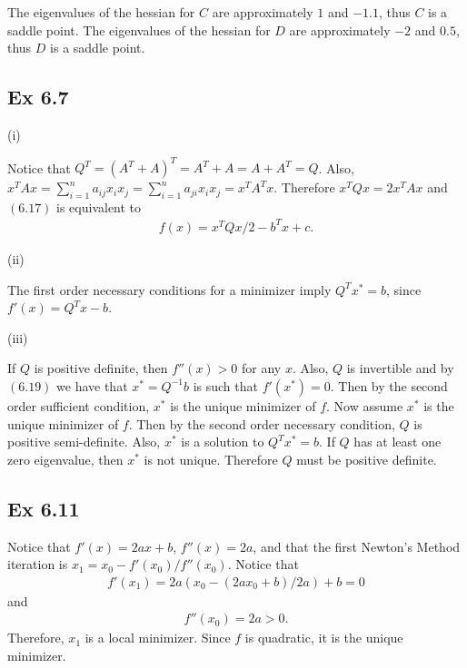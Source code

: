\documentclass[letterpaper,12pt]{article}
\theoremstyle{definition}
\begin{document}
\begin{spacing}{1.3}{}
	The eigenvalues of the hessian for $C$ are approximately $1$ and $-1.1$, thus $C$ is a saddle point. The eigenvalues of the hessian for $D$ are approximately $-2$ and $0.5$, thus $D$ is a saddle point.\\
	
	\subsection*{Ex 6.7}
	(i)
	
	Notice that $Q^T = (A^T + A)^T = A^T+ A = A + A^T = Q$.
	Also, $x^TAx = \sum_{i=1}^na_{ij}x_ix_j = \sum_{i=1}^na_{ji}x_ix_j = x^TA^Tx$.
	Therefore $x^TQx = 2x^TAx$ and $(6.17)$ is equivalent to
	\begin{align*}
	f(x) = x^TQx/2 - b^Tx +c.
	\end{align*}
	
	(ii)
	
	The first order necessary conditions for a minimizer imply
	$Q^Tx^* = b$, since $f'(x) = Q^Tx-b$.
	
	(iii)
	
	If $Q$ is positive definite, then $f''(x)>0$ for any $x$.
	Also, $Q$ is invertible and by $(6.19)$ we have 
	that $x^*=Q^{-1}b$ is such that $f'(x^*)=0$.
	Then by the second order sufficient condition, $x^*$ is the unique minimizer of $f$.
	Now assume $x^*$ is the unique minimizer of $f$.
	Then by the second order necessary condition, $Q$ is positive semi-definite.
	Also, $x^*$ is a solution to $Q^Tx^*=b$.
	If $Q$ has at least one zero eigenvalue, then $x^*$ is not unique.
	Therefore $Q$ must be positive definite.
	
	\subsection*{Ex 6.11}
	Notice that $f'(x)=2ax+b$, $f''(x)=2a$, and that the first Newton's Method iteration is 
	$x_1=x_0-f'(x_0)/f''(x_0)$.
	Notice that 
	\begin{align*}
	f'(x_1)=2a(x_0-(2ax_0+b)/2a)+b=0
	\end{align*}
	and
	\begin{align*}
	f''(x_0)=2a>0.
	\end{align*}
	Therefore, $x_1$ is a local minimizer.
	Since $f$ is quadratic, it is the unique minimizer.
	

\end{spacing}
\end{document}

